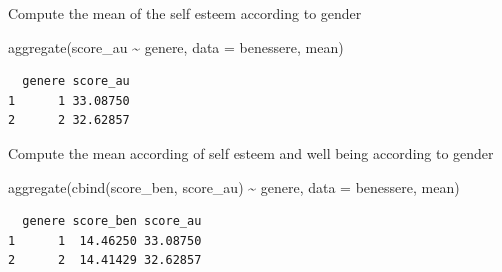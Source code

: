 \documentclass[
  ignorenonframetext,
]{beamer}
\newenvironment{Shaded}{\begin{snugshade}}{\end{snugshade}}
\newcommand{\AttributeTok}[1]{\textcolor[rgb]{0.00,0.34,0.68}{#1}}
\newcommand{\FunctionTok}[1]{\textcolor[rgb]{0.39,0.29,0.61}{#1}}
\newcommand{\NormalTok}[1]{\textcolor[rgb]{0.12,0.11,0.11}{#1}}
\newcommand{\SpecialCharTok}[1]{\textcolor[rgb]{0.24,0.68,0.91}{#1}}
\begin{document}
\begin{frame}[fragile]{}
\protect\hypertarget{section-3}{}
\normalsize

Compute the mean of the self esteem according to gender

\begin{Shaded}
\begin{Highlighting}[]
\FunctionTok{aggregate}\NormalTok{(score\_au }\SpecialCharTok{\textasciitilde{}}\NormalTok{ genere, }\AttributeTok{data =}\NormalTok{ benessere, mean)}
\end{Highlighting}
\end{Shaded}

\begin{verbatim}
  genere score_au
1      1 33.08750
2      2 32.62857
\end{verbatim}

Compute the mean according of self esteem and well being according to
gender

\begin{Shaded}
\begin{Highlighting}[]
\FunctionTok{aggregate}\NormalTok{(}\FunctionTok{cbind}\NormalTok{(score\_ben, score\_au) }\SpecialCharTok{\textasciitilde{}}\NormalTok{ genere, }\AttributeTok{data =}\NormalTok{ benessere, mean)}
\end{Highlighting}
\end{Shaded}

\begin{verbatim}
  genere score_ben score_au
1      1  14.46250 33.08750
2      2  14.41429 32.62857
\end{verbatim}
\end{frame}
\end{document}
